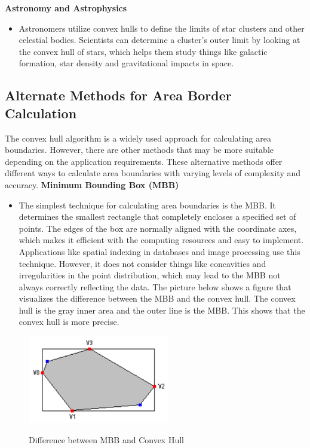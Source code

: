     \textbf{Astronomy and Astrophysics}
    \begin{itemize}
        \item Astronomers utilize convex hulls to define the limits of star clusters and other celestial bodies. Scientists can determine a cluster's outer limit by looking at the convex hull of stars, which helps them study things like galactic formation, star density and gravitational impacts in space.
    \end{itemize}
    \autocite{Andi:irlApplication}

    \subsection{Alternate Methods for Area Border Calculation}
    The convex hull algorithm is a widely used approach for calculating area boundaries. However, there are other methods that may be more suitable depending on the application requirements. These alternative methods offer different ways to calculate area boundaries with varying levels of complexity and accuracy. \newline \newline
    \textbf{Minimum Bounding Box (MBB)}
    \begin{itemize}
        \item The simplest technique for calculating area boundaries is the MBB. It determines the smallest rectangle that completely encloses a specified set of points. The edges of the box are normally aligned with the coordinate axes, which makes it efficient with the computing resources and easy to implement. Applications like spatial indexing in databases and image processing use this technique. However, it does not consider things like concavities and irregularities in the point distribution, which may lead to the MBB not always correctly reflecting the data. The picture below shows a figure that visualizes the difference between the MBB and the convex hull. The convex hull is the gray inner area and the outer line is the MBB. This shows that the convex hull is more precise. \autocite{Andi:mbb}
    \end{itemize} 

    \begin{figure} [H]
        \centering
        \includegraphics [width=0.55\textwidth] {images/andreas/areaBorders/mbb.png}
        \caption{Difference between MBB and Convex Hull}
        \cite{Andi:mbbPic}
    \end{figure}

